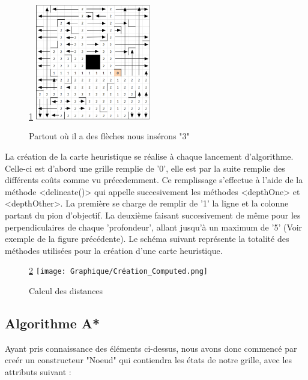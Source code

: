 \documentclass{rapportECL}
\begin{document}
 \begin{figure}[h]
    \centering
    \ref{Fig5}
    \includegraphics[width=0.45\textwidth]{Graphique/Exemple_Heuristique.png}
    \caption{Partout où il a des flèches nous insérons "3"}
    \label{Fig5}
\end{figure}

\newpage
La création de la carte heuristique se réalise à chaque lancement d'algorithme. Celle-ci est d'abord une grille remplie de '0', elle est par la suite remplie des différents coûts comme vu précedemment.
\newline
Ce remplissage s'effectue à l'aide de la méthode <delineate()> qui appelle succesivement les méthodes <depthOne> et <depthOther>. La première se charge de remplir de '1' la ligne et la colonne partant du pion d'objectif. La deuxième faisant succesivement de même pour les perpendiculaires de chaque 'profondeur', allant jusqu'à un maximum de '5' (Voir exemple de la figure précédente). 
\newline
Le schéma suivant représente la totalité des méthodes utilisées pour la création d'une carte heuristique.


\begin{figure}[h]
    \centering
    \ref{Fig6}
    \texttt{[image: Graphique/Création\_Computed.png]}
    \caption{Calcul des distances}
    \label{Fig6}
\end{figure}
\newpage



\subsection{Algorithme A*}

Ayant pris connaissance des éléments ci-dessus, nous avons donc commencé par creér un constructeur "Noeud" qui contiendra les états de notre grille, avec les attributs suivant :
\end{document}
